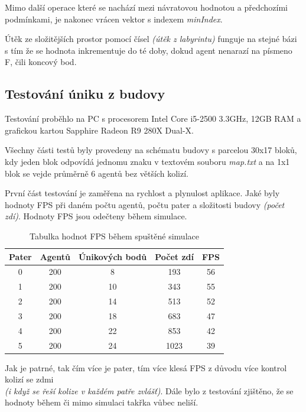 \documentclass[czech,public,dept460,male,cpdeclaration]{diploma}
\begin{document}
Mimo další operace které se nachází mezi návratovou hodnotou a předchozími podmínkami, je nakonec vrácen vektor s indexem \textit{minIndex}.

Útěk ze složitějších prostor pomocí čísel \textit{(útěk z labyrintu)} funguje na stejné bázi s tím že se hodnota inkrementuje do té doby, dokud agent nenarazí na písmeno F, čili koncový bod.

\subsection{Testování úniku z budovy}

Testování proběhlo na PC s procesorem Intel Core i5-2500 3.3GHz, 12GB RAM a grafickou kartou Sapphire Radeon R9 280X Dual-X.

Všechny části testů byly provedeny na schématu budovy s parcelou 30x17 bloků, kdy jeden blok odpovídá jednomu znaku v textovém souboru \textit{map.txt} a na 1x1 blok se vejde průměrně 6 agentů bez větších kolizí.

První část testování je zaměřena na rychlost a plynulost aplikace. Jaké byly hodnoty FPS při daném počtu agentů, počtu pater a složitosti budovy \textit{(počet zdí)}. Hodnoty FPS jsou odečteny během simulace.

\begin{table}[H]
	\centering
	\caption{Tabulka hodnot FPS během spuštěné simulace}
	\label{tab:tablefps}
	\renewcommand{\arraystretch}{1.0}
	\begin{tabular}{| c | c | c | c | c |}
		\hline
		Pater & Agentů & Únikových bodů & Počet zdí & FPS\\\hline
		0 & 200 & 8 & 193 & 56\\
		1 & 200 & 10 & 343 & 55\\
		2 & 200 & 14 & 513 & 52\\
		3 & 200 & 18 & 683 & 47\\
		4 & 200 & 22 & 853 & 42\\
		5 & 200 & 24 & 1023 & 39\\
		\hline
	\end{tabular}
\end{table}

Jak je patrné, tak čím více je pater, tím více klesá FPS z důvodu více kontrol kolizí se zdmi \\\textit{(i když se řeší kolize v každém patře zvlášť)}. Dále bylo z testování zjištěno, že se hodnoty během či mimo simulaci takřka vůbec neliší.
\end{document}

